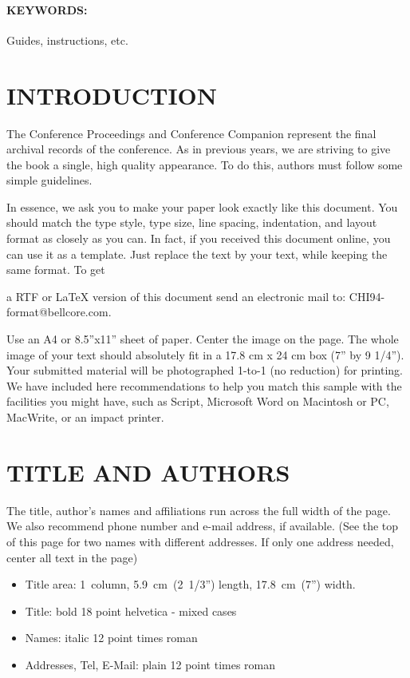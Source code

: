 \paragraph{KEYWORDS:}
Guides, instructions, etc.



\section{INTRODUCTION}

The Conference Proceedings and Conference Companion represent the 
final archival records of the conference. As in previous years, we 
are striving to give the book a single, high quality appearance. To 
do this, authors must follow some simple guidelines.


In essence, we ask you to make your paper look exactly like this 
document. You should match the type style, type size, line spacing, 
indentation, and layout format as closely as you can. In fact, if you 
received this document online, you can use it as a template. Just 
replace the text by your text, while keeping the same format. To get 

a RTF or LaTeX version of this document send an electronic mail to:
CHI94-format@bellcore.com.

Use an A4 or 8.5''x11'' sheet of paper. 
Center the image on the page. The whole image of your text should 
absolutely fit in a 17.8 cm x 24 cm box (7'' by 9 1/4''). Your 
submitted material will be photographed 1-to-1 (no reduction) for 
printing. We have included here recommendations to help you match this 
sample with the facilities you might have, such as Script, Microsoft 
Word on Macintosh or PC, MacWrite, or an impact printer.

\section{TITLE AND AUTHORS}
The title, author's names and affiliations run across the full width 
of the page. We also recommend phone number and e-mail address, if 
available. (See the top of this page for  two names with different 
addresses. If only one address needed, center all text in the page)



\begin{itemize}
\item Title area: 1~column, 5.9~cm~(2~1/3'') length, 17.8~cm~(7'') width.

\item Title: bold 18 point helvetica - mixed cases

\item  Names: italic 12 point times roman 

\item Addresses, Tel, E-Mail: plain 12 point times roman
\end{itemize}



